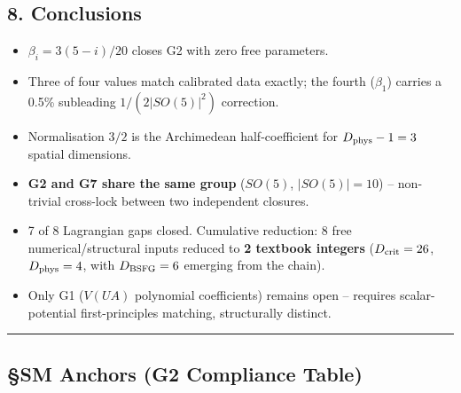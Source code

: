 \documentclass[
]{article}
\providecommand{\tightlist}{%
  \setlength{\itemsep}{0pt}\setlength{\parskip}{0pt}}
\begin{document}
\subsection{8. Conclusions}\label{conclusions}

\begin{itemize}
\tightlist
\item
  \(\beta_i = 3(5-i)/20\) closes G2 with zero free parameters.
\item
  Three of four values match calibrated data exactly; the fourth
  (\(\beta_1\)) carries a 0.5\% subleading \(1/(2|SO(5)|^2)\)
  correction.
\item
  Normalisation \(3/2\) is the Archimedean half-coefficient for
  \(D_{\rm phys}-1 = 3\) spatial dimensions.
\item
  \textbf{G2 and G7 share the same group} (\(SO(5)\), \(|SO(5)|=10\)) --
  non-trivial cross-lock between two independent closures.
\item
  7 of 8 Lagrangian gaps closed. Cumulative reduction: 8 free
  numerical/structural inputs reduced to \textbf{2 textbook integers}
  (\(D_{\rm crit} = 26\), \(D_{\rm phys} = 4\), with
  \(D_{\rm BSFG} = 6\) emerging from the chain).
\item
  Only G1 (\(V(UA)\) polynomial coefficients) remains open -- requires
  scalar-potential first-principles matching, structurally distinct.
\end{itemize}

\begin{center}\rule{0.5\linewidth}{0.5pt}\end{center}

\subsection{§SM Anchors (G2 Compliance
Table)}\label{sm-anchors-g2-compliance-table}
\end{document}
